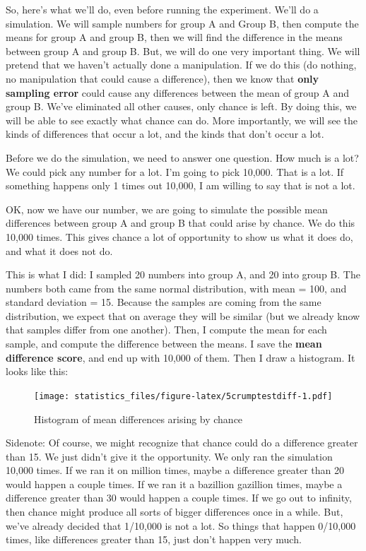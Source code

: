 \documentclass[]{book}
\newenvironment{marginnote}%
  {\itshape}%
  {}
\begin{document}
So, here's what we'll do, even before running the experiment. We'll do a simulation. We will sample numbers for group A and Group B, then compute the means for group A and group B, then we will find the difference in the means between group A and group B. But, we will do one very important thing. We will pretend that we haven't actually done a manipulation. If we do this (do nothing, no manipulation that could cause a difference), then we know that \textbf{only sampling error} could cause any differences between the mean of group A and group B. We've eliminated all other causes, only chance is left. By doing this, we will be able to see exactly what chance can do. More importantly, we will see the kinds of differences that occur a lot, and the kinds that don't occur a lot.

Before we do the simulation, we need to answer one question. How much is a lot? We could pick any number for a lot. I'm going to pick 10,000. That is a lot. If something happens only 1 times out 10,000, I am willing to say that is not a lot.

OK, now we have our number, we are going to simulate the possible mean differences between group A and group B that could arise by chance. We do this 10,000 times. This gives chance a lot of opportunity to show us what it does do, and what it does not do.

This is what I did: I sampled 20 numbers into group A, and 20 into group B. The numbers both came from the same normal distribution, with mean = 100, and standard deviation = 15. Because the samples are coming from the same distribution, we expect that on average they will be similar (but we already know that samples differ from one another). Then, I compute the mean for each sample, and compute the difference between the means. I save the \textbf{mean difference score}, and end up with 10,000 of them. Then I draw a histogram. It looks like this:

\begin{figure}
\centering
\texttt{[image: statistics\_files/figure-latex/5crumptestdiff-1.pdf]}
\caption{\label{fig:5crumptestdiff}Histogram of mean differences arising by chance}
\end{figure}

\begin{marginnote}

Sidenote: Of course, we might recognize that chance could do a difference greater than 15. We just didn't give it the opportunity. We only ran the simulation 10,000 times. If we ran it on million times, maybe a difference greater than 20 would happen a couple times. If we ran it a bazillion gazillion times, maybe a difference greater than 30 would happen a couple times. If we go out to infinity, then chance might produce all sorts of bigger differences once in a while. But, we've already decided that 1/10,000 is not a lot. So things that happen 0/10,000 times, like differences greater than 15, just don't happen very much.

\end{marginnote}
\end{document}
